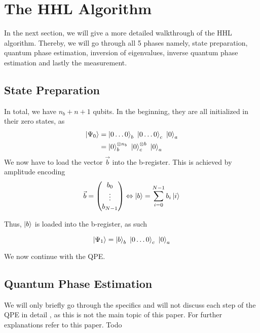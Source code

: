 \section{The HHL Algorithm}
In the next section, we will give a more detailed walkthrough of the HHL algorithm.
Thereby, we will go through all 5 phases namely, state preparation, quantum phase estimation, inversion of eigenvalues, inverse quantum phase estimation and lastly the measurement.

\subsection{State Preparation}

In total, we have $n_b + n + 1$ qubits. 
In the beginning, they are all initialized in their zero states, as
\begin{equation}
\begin{split}
\ket{\Psi_0} &= \ket{0\dots0}_b\ \ket{0\dots0}_c\ \ket{0}_a \\
&= \ket{0}_b^{{\otimes n_b}}\ \ket{0}_c^{\otimes b}\ \ket{0}_a 
\end{split}
\end{equation}
We now have to load the vector $\vec{b}$ into the b-register. 
This is achieved by amplitude encoding
\begin{equation}
    \vec{b} = \begin{pmatrix} b_0\\ \vdots \\ b_{N-1} \end{pmatrix} 
    \Leftrightarrow  
     \ket b = \sum_{i=0}^{N-1} b_i \ket i
\end{equation}

Thus, $\ket b$ is loaded into the b-register, as such

\begin{equation}
\ket{\Psi_1} = \ket{b}_b\ \ket{0\dots0}_c\ \ket{0}_a
\end{equation}

We now continue with the QPE. 

\subsection{Quantum Phase Estimation}
We will only briefly go through the specifics  and will not discuss each step of the QPE in detail , as this is not the main topic of this paper. 
For further explanations refer to this paper.
Todo

